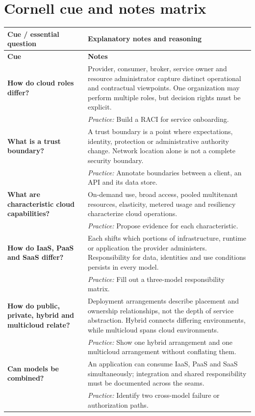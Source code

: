 \documentclass[10pt,letterpaper]{article}
\begin{document}
\section{Cornell cue and notes matrix}
\small\setlength{\LTleft}{0pt}\setlength{\LTright}{0pt plus 1fill}
\begin{longtable}{>{\RaggedRight\arraybackslash}p{}>{\RaggedRight\arraybackslash}p{}}
\toprule\textbf{Cue / essential question}&\textbf{Explanatory notes and reasoning}\\\midrule\endfirsthead\toprule\textbf{Cue}&\textbf{Notes}\\\midrule\endhead
\textbf{How do cloud roles differ?} & Provider, consumer, broker, service owner and resource administrator capture distinct operational and contractual viewpoints. One organization may perform multiple roles, but decision rights must be explicit.\\[3pt]& \textcolor{petrol}{\emph{Practice:} Build a RACI for service onboarding.}\\[8pt]\midrule
\textbf{What is a trust boundary?} & A trust boundary is a point where expectations, identity, protection or administrative authority change. Network location alone is not a complete security boundary.\\[3pt]& \textcolor{petrol}{\emph{Practice:} Annotate boundaries between a client, an API and its data store.}\\[8pt]\midrule
\textbf{What are characteristic cloud capabilities?} & On-demand use, broad access, pooled multitenant resources, elasticity, metered usage and resiliency characterize cloud operations.\\[3pt]& \textcolor{petrol}{\emph{Practice:} Propose evidence for each characteristic.}\\[8pt]\midrule
\textbf{How do IaaS, PaaS and SaaS differ?} & Each shifts which portions of infrastructure, runtime or application the provider administers. Responsibility for data, identities and use conditions persists in every model.\\[3pt]& \textcolor{petrol}{\emph{Practice:} Fill out a three-model responsibility matrix.}\\[8pt]\midrule
\textbf{How do public, private, hybrid and multicloud relate?} & Deployment arrangements describe placement and ownership relationships, not the depth of service abstraction. Hybrid connects differing environments, while multicloud spans cloud environments.\\[3pt]& \textcolor{petrol}{\emph{Practice:} Show one hybrid arrangement and one multicloud arrangement without conflating them.}\\[8pt]\midrule
\textbf{Can models be combined?} & An application can consume IaaS, PaaS and SaaS simultaneously; integration and shared responsibility must be documented across the seams.\\[3pt]& \textcolor{petrol}{\emph{Practice:} Identify two cross-model failure or authorization paths.}\\[8pt]\midrule
\end{longtable}\normalsize
\end{document}
